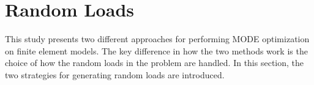 \section{Random Loads}
This study presents two different approaches for performing MODE optimization on finite element models. The key difference in how the two methods work is the choice of how the random loads in the problem are handled. In this section, the two strategies for generating random loads are introduced. 


